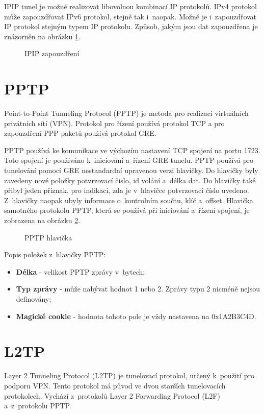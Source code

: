 IPIP tunel je možné realizovat libovolnou kombinací IP protokolů. IPv4 protokol může zapouzdřovat IPv6 protokol, stejně tak i~naopak. Možné je i~zapouzdřovat IP protokol stejným typem IP protokolu. Způsob, jakým jsou dat zapouzdřena je znázorněn na obrázku \ref{img:ipip}.

\begin{figure}[H]
    \centering
    \caption{IPIP zapouzdření}
    \label{img:ipip}
\end{figure}

\section{PPTP}
\label{sec:pptp}
Point-to-Point Tunneling Protocol (PPTP) \cite{pptp} je metoda pro realizaci virtuálních privátních sítí (VPN). Protokol pro řízení používá protokol TCP a pro zapouzdření PPP paketů používá protokol GRE.

PPTP používá ke komunikace ve výchozím nastavení TCP spojení na portu 1723. Toto spojení je používáno k~iniciování a~řízení GRE tunelu. PPTP používá pro tunelování pomocí GRE nestandardní upravenou verzi hlavičky. Do hlavičky byly zavedeny nové položky potvrzovací číslo, id volání a~délka dat. Do hlavičky také přibyl jeden příznak, pro indikaci, zda je v~hlavičce potvrzovací číslo uvedeno. Z~hlavičky naopak ubyly informace o~kontrolním součtu, klíč a~offset. Hlavička samotného protokolu PPTP, která se používá při iniciování a~řízení spojení, je zobrazena na obrázku \ref{img:hlavicka_pptp}. 

\begin{figure}[H]
    \centering
    \caption{PPTP hlavička}
    \label{img:hlavicka_pptp}
\end{figure}

Popis položek z~hlavičky PPTP:

\begin{itemize}
    \item \textbf{Délka} - velikost PPTP zprávy v~bytech;
    \item \textbf{Typ zprávy} - může nabývat hodnot 1 nebo 2. Zprávy typu 2 nicméně nejsou definovány;
    \item \textbf{Magické cookie} - hodnota tohoto pole je vždy nastavena na 0x1A2B3C4D.
\end{itemize}

\section{L2TP}
Layer 2 Tunneling Protocol (L2TP) \cite{l2tpv2} je tunelovací protokol, určený k~použití pro podporu VPN. Tento protokol má původ ve dvou starších tunelovacích protokolech. Vychází z~protokolů Layer 2 Forwarding Protocol (L2F) a~z~protokolu PPTP.

